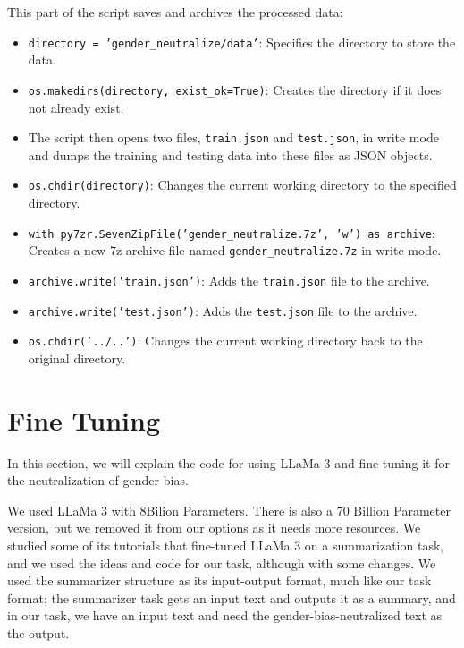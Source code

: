 \documentclass{solutionclass} %
\begin{document}
\begin{solution}
This part of the script saves and archives the processed data:

\begin{itemize}
	\item \texttt{directory = 'gender\_neutralize/data'}: Specifies the directory to store the data.
	\item \texttt{os.makedirs(directory, exist\_ok=True)}: Creates the directory if it does not already exist.
	\item The script then opens two files, \texttt{train.json} and \texttt{test.json}, in write mode and dumps the training and testing data into these files as JSON objects.
	\item \texttt{os.chdir(directory)}: Changes the current working directory to the specified directory.
	\item \texttt{with py7zr.SevenZipFile('gender\_neutralize.7z', 'w') as archive}: Creates a new 7z archive file named \texttt{gender\_neutralize.7z} in write mode.
	\item \texttt{archive.write('train.json')}: Adds the \texttt{train.json} file to the archive.
	\item \texttt{archive.write('test.json')}: Adds the \texttt{test.json} file to the archive.
	\item \texttt{os.chdir('../..')}: Changes the current working directory back to the original directory.
\end{itemize}
\end{solution}

\section{Fine Tuning}

In this section, we will explain the code for using LLaMa 3 and fine-tuning it for the neutralization of gender bias.

We used LLaMa 3 with 8Bilion Parameters. There is also a 70 Billion Parameter version, but we removed it from our options as it needs more resources. We studied some of its tutorials that fine-tuned LLaMa 3 on a summarization task, and we used the ideas and code for our task, although with some changes. We used the summarizer structure as its input-output format, much like our task format; the summarizer task gets an input text and outputs it as a summary, and in our task, we have an input text and need the gender-bias-neutralized text as the output.
\end{document}
